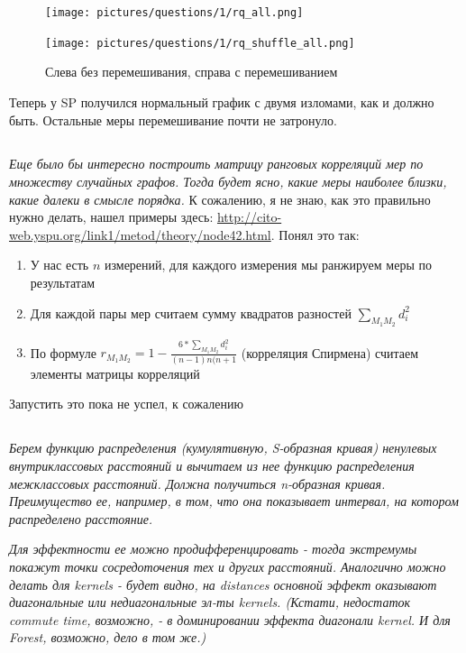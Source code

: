 \documentclass{article}
\begin{document}
\begin{figure}[H] %
	\begin{minipage}{.5\textwidth}
		\centerline{
			\texttt{[image: pictures/questions/1/rq\_all.png]}
		}
	\end{minipage}%
	\begin{minipage}{.5\textwidth}
		\centerline{
			\texttt{[image: pictures/questions/1/rq\_shuffle\_all.png]}
		}
	\end{minipage}%
\caption{\label{f_Rcur} Слева без перемешивания, справа с перемешиванием}
\end{figure}

Теперь у SP получился нормальный график с двумя изломами, как и должно быть. Остальные меры перемешивание почти не затронуло.

\subsection{}
\textit{Еще было бы интересно построить матрицу ранговых корреляций мер по множеству случайных графов.
Тогда будет ясно, какие меры наиболее близки, какие далеки в смысле порядка.}
К сожалению, я не знаю, как это правильно нужно делать, нашел примеры здесь: \url{http://cito-web.yspu.org/link1/metod/theory/node42.html}. Понял это так:
\begin{enumerate}
\item У нас есть $n$ измерений, для каждого измерения мы ранжируем меры по результатам
\item Для каждой пары мер считаем сумму квадратов разностей $\sum_{M_1M_2} d_i^2$
\item По формуле $r_{M_1M_2} = 1 - \frac{6 * \sum_{M_1M_2} d_i^2}{(n-1)n(n+1}$ (корреляция Спирмена) считаем элементы матрицы корреляций
\end{enumerate}

Запустить это пока не успел, к сожалению


\subsection{}
\textit{Берем функцию распределения (кумулятивную, S-образная кривая) ненулевых внутриклассовых расстояний и вычитаем из нее функцию распределения межклассовых расстояний. Должна получиться n-образная кривая. Преимущество ее, например, в том, что она показывает интервал, на котором распределено расстояние.}

\textit{Для эффектности ее можно продифференцировать - тогда экстремумы покажут точки сосредоточения тех и других расстояний. Аналогично можно делать для kernels - будет видно, на distances основной эффект оказывают диагональные или недиагональные эл-ты kernels. (Кстати, недостаток commute time, возможно, - в доминировании эффекта диагонали kernel. И для Forest, возможно, дело в том же.)}
\end{document}
